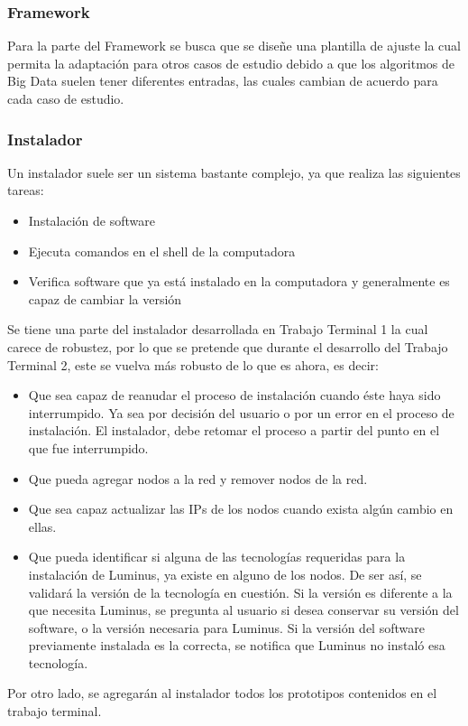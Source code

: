 \subsubsection{Framework}
Para la parte del Framework se busca que se diseñe una plantilla de ajuste la cual permita la adaptación para otros casos de estudio debido a que los algoritmos de Big Data suelen tener diferentes entradas, las cuales cambian de acuerdo para cada caso de estudio.
\\
\subsubsection{Instalador}
Un instalador suele ser un sistema bastante complejo, ya que realiza las siguientes tareas:\\
\begin{itemize}
	\item Instalación de software
	\item Ejecuta comandos en el shell de la computadora
	\item Verifica software que ya está instalado en la computadora y generalmente es capaz de cambiar la versión
\end{itemize}
Se tiene una parte del instalador desarrollada en Trabajo Terminal 1 la cual carece de robustez, por lo que se pretende que durante el desarrollo del Trabajo Terminal 2, este se vuelva más robusto de lo que es ahora, es decir:
\begin{itemize}
	\item Que sea capaz de reanudar el proceso de instalación cuando éste haya sido interrumpido. Ya sea por decisión del usuario o por un error en el proceso de instalación. El instalador, debe retomar el proceso a partir del punto en el que fue interrumpido.
	\item Que pueda agregar nodos a la red y remover nodos de la red.
	\item Que sea capaz actualizar las IPs de los nodos cuando exista algún cambio en ellas.
	\item Que pueda identificar si alguna de las tecnologías requeridas para la instalación de Luminus, ya existe en alguno de los nodos. De ser así, se validará la versión de la tecnología en cuestión. Si la versión es diferente a la que necesita Luminus, se pregunta al usuario si desea conservar su versión del software, o la versión necesaria para Luminus. Si la versión del software previamente instalada es la correcta, se notifica que Luminus no instaló esa tecnología.
\end{itemize}
Por otro lado, se agregarán al instalador todos los prototipos contenidos en el trabajo terminal.
